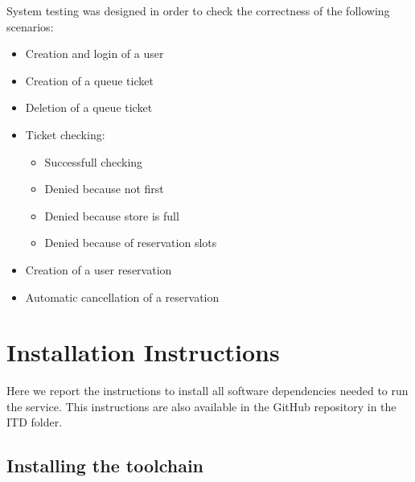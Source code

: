 \documentclass[
]{article}
\begin{document}
System testing was designed in order to check the correctness of the following scenarios:
\begin{itemize}
  \item Creation and login of a user
  \item Creation of a queue ticket
  \item Deletion of a queue ticket
  \item Ticket checking:
  \begin{itemize}
    \item Successfull checking
    \item Denied because not first
    \item Denied because store is full
    \item Denied because of reservation slots
  \end{itemize}
  \item Creation of a user reservation
  \item Automatic cancellation of a reservation
\end{itemize}

\hypertarget{installation-instructions}{%
\section{Installation Instructions}\label{installation-instructions}}

Here we report the instructions to install all software dependencies
needed to run the service. This instructions are also available in the
GitHub repository in the ITD folder.

\hypertarget{installing-the-toolchain}{%
\subsection{Installing the toolchain}\label{installing-the-toolchain}}
\end{document}
